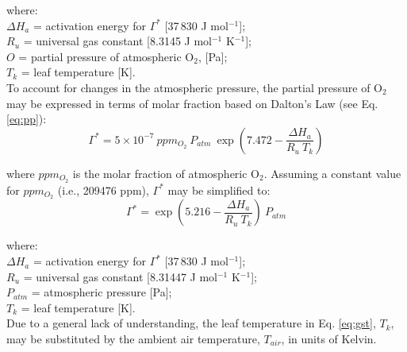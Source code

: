\documentclass{myreport}
\begin{document}
\noindent where:\\
\indent $\Delta H_a$ = activation energy for $\Gamma^\ast$ [37$\,$830 J mol$^{-1}$];\\
\indent $R_u$ = universal gas constant [8.3145 J mol$^{-1}$ K$^{-1}$];\\
\indent $O$ = partial pressure of atmospheric O$_2$, [Pa];\\
\indent $T_k$ = leaf temperature [K].\\

\noindent To account for changes in the atmospheric pressure, the partial pressure of O$_2$ may be expressed in terms of molar fraction based on Dalton's Law (see Eq. \ref{eq:pp}):
\begin{equation}
\label{eq:gstpa}
    \Gamma^\ast = 5\times 10^{-7}\: ppm_{O_2}\: P_{atm}\: \exp \left(7.472 - \frac{\Delta H_a}{R_u\: T_k}\right)
\end{equation}

\noindent where $ppm_{O_2}$ is the molar fraction of atmospheric O$_2$. Assuming a constant value for $ppm_{O_2}$ (i.e., 209476 ppm), $\Gamma^\ast$ may be simplified to:
\begin{equation}
\label{eq:gstpb}
    \Gamma^\ast = \exp \left(5.216 - \frac{\Delta H_a}{R_u\: T_k}\right)\: P_{atm}
\end{equation}

\noindent where:\\
\indent $\Delta H_a$ = activation energy for $\Gamma^\ast$ [37$\,$830 J mol$^{-1}$];\\
\indent $R_u$ = universal gas constant [8.31447 J mol$^{-1}$ K$^{-1}$];\\
\indent $P_{atm}$ = atmospheric pressure [Pa];\\
\indent $T_k$ = leaf temperature [K].\\

\noindent Due to a general lack of understanding, the leaf temperature in Eq. \ref{eq:gst}, $T_k$, may be substituted by the ambient air temperature, $T_{air}$, in units of Kelvin. 
\end{document}
